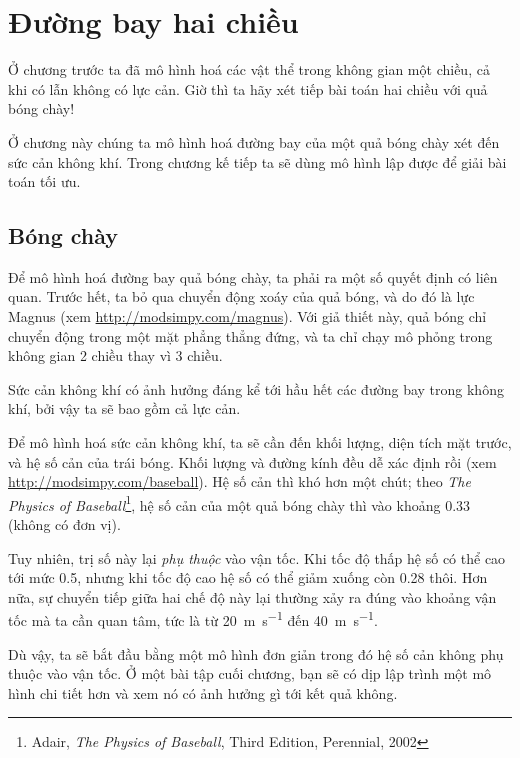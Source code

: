 \documentclass[12pt]{book}
\theoremstyle{exercise}
\begin{document}
\chapter{Đường bay hai chiều}
\label{chap22}

Ở chương trước ta đã mô hình hoá các vật thể trong không gian một chiều, cả khi có lẫn không có lực cản. Giờ thì ta hãy xét tiếp bài toán hai chiều với quả bóng chày!

Ở chương này chúng ta mô hình hoá đường bay của một quả bóng chày xét đến sức cản không khí. Trong chương kế tiếp ta sẽ dùng mô hình lập được để giải bài toán tối ưu.


\section{Bóng chày}
\label{baseball}

Để mô hình hoá đường bay quả bóng chày, ta phải ra một số quyết định có liên quan. Trước hết, ta bỏ qua chuyển động xoáy của quả bóng, và do đó là lực Magnus (xem  \url{http://modsimpy.com/magnus}).  Với giả thiết này, quả bóng chỉ chuyển động trong một mặt phẳng thẳng đứng, và ta chỉ chạy mô phỏng trong không gian 2 chiều thay vì 3 chiều.


Sức cản không khí có ảnh hưởng đáng kể tới hầu hết các đường bay trong không khí, bởi vậy ta sẽ bao gồm cả lực cản.


Để mô hình hoá sức cản không khí, ta sẽ cần đến khối lượng, diện tích mặt trước, và hệ số cản của trái bóng. Khối lượng và đường kính đều dễ xác định rồi (xem  \url{http://modsimpy.com/baseball}).  Hệ số cản thì khó hơn một chút; theo {\it The Physics of Baseball}\footnote{Adair, {\it The Physics of Baseball}, Third Edition, Perennial, 2002}, hệ số cản của một quả bóng chày thì vào khoảng 0.33 (không có đơn vị).


Tuy nhiên, trị số này lại {\em phụ thuộc} vào vận tốc. Khi tốc độ thấp hệ số có thể cao tới mức 0.5, nhưng khi tốc độ cao hệ số có thể giảm xuống còn 0.28 thôi.  Hơn nữa, sự chuyển tiếp giữa hai chế độ này lại thường xảy ra đúng vào khoảng vận tốc mà ta cần quan tâm, tức là từ \SI{20}{\meter\per\second} đến \SI{40}{\meter\per\second}.

Dù vậy, ta sẽ bắt đầu bằng một mô hình đơn giản trong đó hệ số cản không phụ thuộc vào vận tốc. Ở một bài tập cuối chương, bạn sẽ có dịp lập trình một mô hình chi tiết hơn và xem nó có ảnh hưởng gì tới kết quả không.
\end{document}
